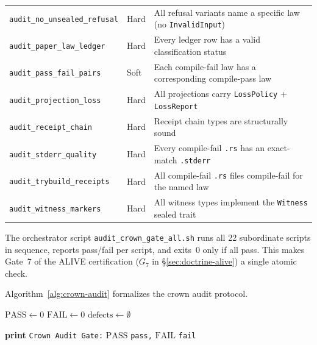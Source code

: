\begin{table}[ht]
\begin{tabular}{@{}llp{6cm}@{}}
\texttt{audit\_no\_unsealed\_refusal} & Hard & All refusal variants name a specific law (no \texttt{InvalidInput}) \\
\texttt{audit\_paper\_law\_ledger}    & Hard & Every ledger row has a valid classification status \\
\texttt{audit\_pass\_fail\_pairs}     & Soft & Each compile-fail law has a corresponding compile-pass law \\
\texttt{audit\_projection\_loss}      & Hard & All projections carry \texttt{LossPolicy} + \texttt{LossReport} \\
\texttt{audit\_receipt\_chain}        & Hard & Receipt chain types are structurally sound \\
\texttt{audit\_stderr\_quality}       & Hard & Every compile-fail \texttt{.rs} has an exact-match \texttt{.stderr} \\
\texttt{audit\_trybuild\_receipts}    & Hard & All compile-fail \texttt{.rs} files compile-fail for the named law \\
\texttt{audit\_witness\_markers}      & Hard & All witness types implement the \texttt{Witness} sealed trait \\
\bottomrule
\end{tabular}
\end{table}

The orchestrator script \texttt{audit\_crown\_gate\_all.sh} runs all 22 subordinate scripts
in sequence, reports pass/fail per script, and exits~0 only if all pass. This makes Gate~7
of the ALIVE certification ($G_7$ in \S\ref{sec:doctrine-alive}) a single atomic check.

Algorithm~\ref{alg:crown-audit} formalizes the crown audit protocol.

\begin{algorithm}[ht]
\caption{Crown Audit Protocol (\texttt{audit\_crown\_gate\_all.sh})}
\label{alg:crown-audit}
\DontPrintSemicolon
{}

$\text{PASS} \leftarrow 0$\;
$\text{FAIL} \leftarrow 0$\;
$\text{defects} \leftarrow \emptyset$\;


\textbf{print} \texttt{Crown Audit Gate:} $\text{PASS}$ \texttt{pass,} $\text{FAIL}$ \texttt{fail}\;

\end{algorithm}


